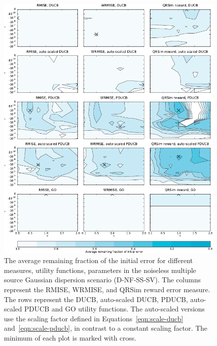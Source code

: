 \begin{figure}
    \centering
    \includegraphics{plots/psearch-D-NF-MS-SV}
    \caption[Remaining fraction of the initial error (D-NF-MS-SV)]{The average 
        remaining fraction of the initial error for different measures, utility 
        functions, parameters in the noiseless multiple source Gaussian 
        dispersion scenario (D-NF-SS-SV).  The columns represent the RMISE, 
        WRMISE, and QRSim reward error measure.  The rows represent the DUCB, 
        auto-scaled DUCB, PDUCB, auto-scaled PDUCB and GO utility functions. The 
        auto-scaled versions use the scaling factor defined in 
        Equations~\ref{eqn:scale-ducb} and~\ref{eqn:scale-pducb}, in contrast to 
        a constant scaling factor.  The minimum of each plot is marked with 
        cross.}\label{fig:psearch-D-NF-MS-SV}
\end{figure}
